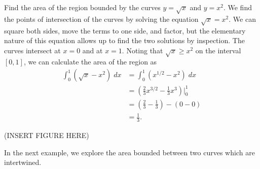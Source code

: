 \documentclass{ximera}
\begin{document}
\begin{example}
Find the area of the region bounded by the curves $y = \sqrt x$ and $y = x^2$.
We find the points of intersection of the curves by solving the equation $\sqrt x = x^2$.
We can square both sides, move the terms to one side, and factor, but the elementary nature of this equation allows up 
to find the two solutions by inspection.  The curves intersect at $x = 0$ and at $x = 1$.
Noting that $\sqrt x \geq x^2$ on the interval $[0,1]$, we can calculate the area of the region as
\begin{align*}
\int_0^1 \left(\sqrt x - x^2 \right) \; dx &= \int_0^1 \left(x^{1/2} - x^2 \right) \; dx  \\
                                          &=  \left(\frac23 x^{3/2} - \frac13 x^3 \right) \bigg|_0^1 \\
                                          &=  \left( \tfrac23 - \tfrac13 \right) - (0-0) \\
                                          &= \frac13.
\end{align*}

(INSERT FIGURE HERE)

\end{example}

In the next example, we explore the area bounded between two curves which are intertwined.
\end{document}
